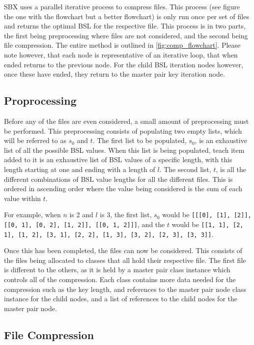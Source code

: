 \documentclass{hehe}
\begin{document}
SBX uses a parallel iterative process to compress files. This process (see figure the one with the flowchart but a better flowchart) is only run once per set of files and returns the optimal BSL for the respective file. This process is in two parts, the first being preprocessing where files are not considered, and the second being file compression. The entire method is outlined in \cref{fig:comp_flowchart}. Please note however, that each node is representative of an iterative loop, that when ended returns to the previous node. For the child BSL iteration nodes however, once these have ended, they return to the master pair key iteration node.

\subsection{Proprocessing}

Before any of the files are even considered, a small amount of preprocessing must be performed. This preprocessing consists of populating two empty lists, which will be referred to as $s_0$ and $t$. The first list to be populated, $s_0$, is an exhaustive list of all the possible BSL values. When this list is being populated, teach item added to it is an exhaustive list of BSL values of a specific length, with this length starting at one and ending with a length of $l$. The second list, $t$, is all the different combinations of BSL value lengths for all the different files. This is ordered in ascending order where the value being considered is the sum of each value within $t$.

For example, when $n$ is 2 and $l$ is 3, the first list, $s_0$ would be \texttt{[[[0], [1], [2]], [[0, 1], [0, 2], [1, 2]], [[0, 1, 2]]]}, and the $t$ would be \texttt{[[1, 1], [2, 1], [1, 2], [3, 1], [2, 2], [1, 3], [3, 2], [2, 3], [3, 3]]}.

Once this has been completed, the files can now be considered. This consists of the files being allocated to classes that all hold their respective file. The first file is different to the others, as it is held by a master pair class instance which controls all of the compression. Each class contains more data needed for the compression such as the key length, and references to the master pair node class instance for the child nodes, and a list of references to the child nodes for the master pair node.

\subsection{File Compression}
\end{document}
